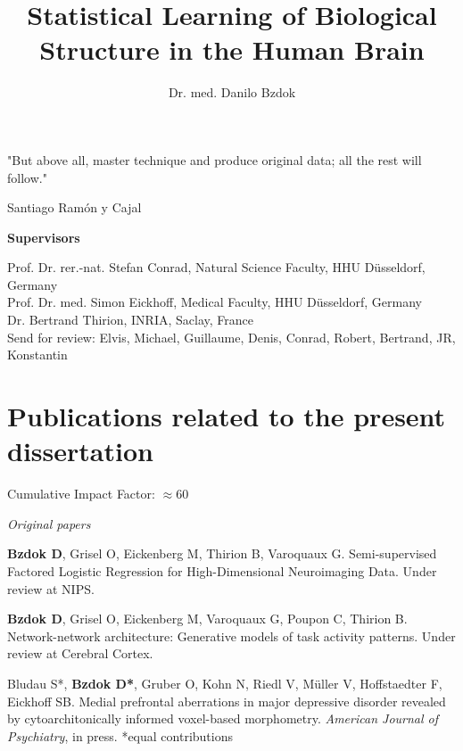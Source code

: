 \documentclass[authoryear,review,3p]{elsarticle}
\begin{document}
\begin{frontmatter}

\title{Statistical Learning of Biological Structure in the Human Brain}

\author{Dr. med. Danilo Bzdok}

\end{frontmatter}

\bigskip
\bigskip
\bigskip
\centerline{
"But above all, master technique and produce original data; 
all the rest will follow."}
\centerline{Santiago Ram\'{o}n y Cajal}

\bigskip
\bigskip
\bigskip

\textbf{Supervisors\\}

Prof. Dr. rer.-nat. Stefan Conrad, Natural Science Faculty, HHU D\"usseldorf, Germany\\

Prof. Dr. med. Simon Eickhoff, Medical Faculty, HHU D\"usseldorf, Germany\\

Dr. Bertrand Thirion, INRIA, Saclay, France\\


Send for review:
Elvis, Michael, Guillaume, Denis, Conrad, Robert,
Bertrand, JR, Konstantin


\bigskip

\newpage
\section*{Publications related to the present dissertation}

\linebreak
Cumulative Impact Factor: $\approx$60

\linebreak
\textit{Original papers}

\textbf{Bzdok D}, Grisel O, Eickenberg M, Thirion B, Varoquaux G.
Semi-supervised Factored Logistic Regression for High-Dimensional
Neuroimaging Data. Under review at NIPS.

\textbf{Bzdok D}, Grisel O, Eickenberg M, Varoquaux G, Poupon C, Thirion B.
Network-network architecture: Generative models of task activity patterns.
Under review at Cerebral Cortex.

Bludau S*, \textbf{Bzdok D*}, Gruber O,
Kohn N, Riedl V, Müller V, Hoffstaedter F, Eickhoff SB.
Medial prefrontal aberrations in major depressive disorder
revealed by cytoarchitonically informed voxel-based morphometry.
\textit{American Journal of Psychiatry}, in press. *equal contributions
\end{document}
